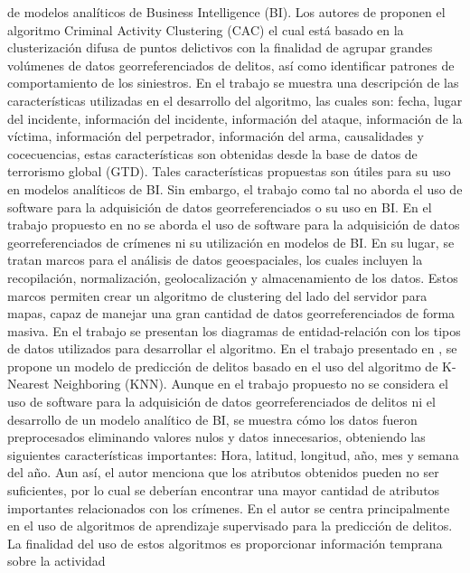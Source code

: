 de modelos analíticos de Business Intelligence (BI).
\bigbreak
Los autores de \cite{winPCPDParallelCrime2019} proponen el algoritmo Criminal Activity Clustering (CAC) el cual está basado
en la clusterización difusa de puntos delictivos con la finalidad de agrupar grandes volúmenes de datos georreferenciados de delitos,
así como identificar patrones de comportamiento de los siniestros. En el trabajo se muestra una descripción de las características
utilizadas en el desarrollo del algoritmo, las cuales son: fecha, lugar del incidente, información del incidente, información del ataque,
información de la víctima, información del perpetrador, información del arma, causalidades y cocecuencias, estas características son
obtenidas desde la base de datos de terrorismo global (GTD). Tales características propuestas son útiles para su uso en modelos
analíticos de BI. Sin embargo, el trabajo como tal no aborda el uso de software para la adquisición de datos georreferenciados o
su uso en BI.
\bigbreak
En el trabajo propuesto en \cite{amirkhanyanMethodsFrameworksGeoSpatioTemporal2019} no se aborda el uso de software para la
adquisición de datos georreferenciados de crímenes ni su utilización en modelos de BI. En su lugar, se tratan marcos para el
análisis de datos geoespaciales, los cuales incluyen la recopilación, normalización, geolocalización y almacenamiento de los datos.
Estos marcos permiten crear un algoritmo de clustering del lado del servidor para mapas, capaz de manejar una gran cantidad de datos
georreferenciados de forma masiva. En el trabajo se presentan los diagramas de entidad-relación con los tipos de datos utilizados
para desarrollar el algoritmo.
\bigbreak
En el trabajo presentado en \cite{kumarCrimePredictionUsing2020}, se propone un modelo de predicción de delitos basado en el uso
del algoritmo de K-Nearest Neighboring (KNN). Aunque en el trabajo propuesto no se considera el uso de software para la adquisición de datos
georreferenciados de delitos ni el desarrollo de un modelo analítico de BI, se muestra cómo los datos fueron preprocesados eliminando
valores nulos y datos innecesarios, obteniendo las siguientes características importantes: Hora, latitud, longitud, año, mes y semana del año.
Aun así, el autor menciona que los atributos obtenidos pueden no ser suficientes, por lo cual se deberían encontrar una mayor cantidad
de atributos importantes relacionados con los crímenes.
\bigbreak
En \cite{hossainCrimePredictionUsing2020} el autor se centra principalmente en el uso de algoritmos de aprendizaje supervisado
para la predicción de delitos. La finalidad del uso de estos algoritmos es proporcionar información temprana sobre la actividad
